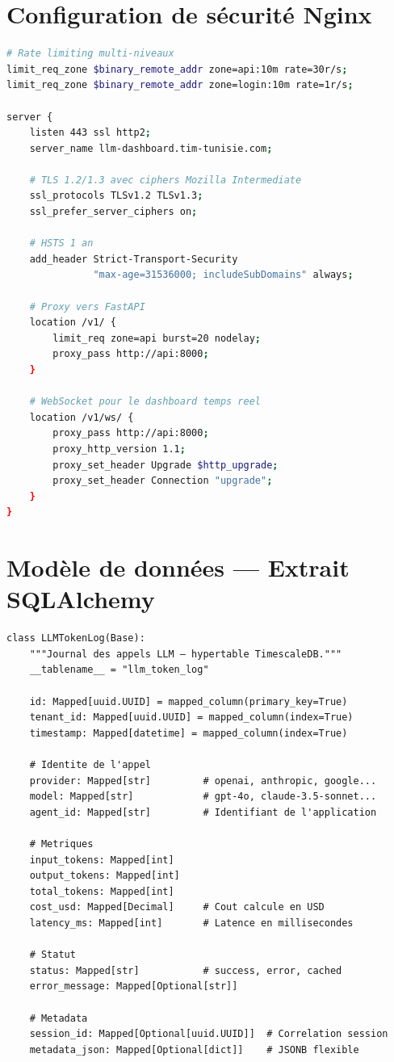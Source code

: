 \section{Configuration de sécurité Nginx}

\begin{lstlisting}[language=bash, caption={Extrait de la configuration Nginx (nginx/nginx.conf)}]
# Rate limiting multi-niveaux
limit_req_zone $binary_remote_addr zone=api:10m rate=30r/s;
limit_req_zone $binary_remote_addr zone=login:10m rate=1r/s;

server {
    listen 443 ssl http2;
    server_name llm-dashboard.tim-tunisie.com;
    
    # TLS 1.2/1.3 avec ciphers Mozilla Intermediate
    ssl_protocols TLSv1.2 TLSv1.3;
    ssl_prefer_server_ciphers on;
    
    # HSTS 1 an
    add_header Strict-Transport-Security 
               "max-age=31536000; includeSubDomains" always;
    
    # Proxy vers FastAPI
    location /v1/ {
        limit_req zone=api burst=20 nodelay;
        proxy_pass http://api:8000;
    }
    
    # WebSocket pour le dashboard temps reel
    location /v1/ws/ {
        proxy_pass http://api:8000;
        proxy_http_version 1.1;
        proxy_set_header Upgrade $http_upgrade;
        proxy_set_header Connection "upgrade";
    }
}
\end{lstlisting}


\section{Modèle de données --- Extrait SQLAlchemy}

\begin{lstlisting}[language=Python3, caption={Modèle LLMTokenLog (modules/gateway/models.py)}]
class LLMTokenLog(Base):
    """Journal des appels LLM — hypertable TimescaleDB."""
    __tablename__ = "llm_token_log"
    
    id: Mapped[uuid.UUID] = mapped_column(primary_key=True)
    tenant_id: Mapped[uuid.UUID] = mapped_column(index=True)
    timestamp: Mapped[datetime] = mapped_column(index=True)
    
    # Identite de l'appel
    provider: Mapped[str]         # openai, anthropic, google...
    model: Mapped[str]            # gpt-4o, claude-3.5-sonnet...
    agent_id: Mapped[str]         # Identifiant de l'application
    
    # Metriques
    input_tokens: Mapped[int]
    output_tokens: Mapped[int]
    total_tokens: Mapped[int]
    cost_usd: Mapped[Decimal]     # Cout calcule en USD
    latency_ms: Mapped[int]       # Latence en millisecondes
    
    # Statut
    status: Mapped[str]           # success, error, cached
    error_message: Mapped[Optional[str]]
    
    # Metadata
    session_id: Mapped[Optional[uuid.UUID]]  # Correlation session
    metadata_json: Mapped[Optional[dict]]    # JSONB flexible
\end{lstlisting}



